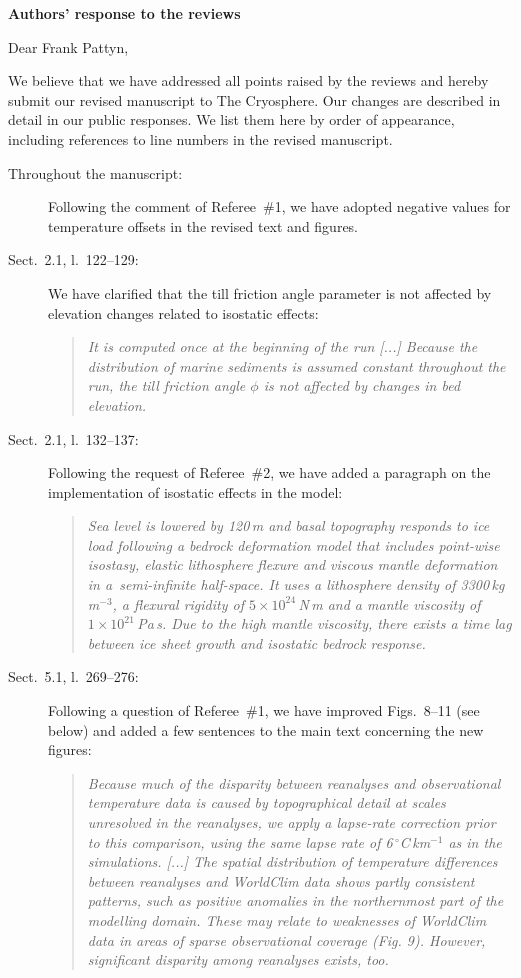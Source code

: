 \documentclass[10pt]{article}
\begin{document}
\textbf{Authors' response to the reviews}
\bigskip

\def\msquote#1{\begin{quote}\textit{#1}\end{quote}}

Dear Frank Pattyn,

We believe that we have addressed all points raised by the reviews and hereby submit our revised manuscript to The Cryosphere. Our changes are described in detail in our public responses. We list them here by order of appearance, including references to line numbers in the revised manuscript.

\begin{description}

\item[Throughout the manuscript:]
  Following the comment of Referee~{\#}1, we have adopted negative values for temperature offsets in the revised text and figures.

\item[Sect.~2.1, l.~122--129:]
  We have clarified that the till friction angle parameter is not affected by elevation changes related to isostatic effects:

  \msquote{It is computed once at the beginning of the run [...] Because the distribution of marine sediments is assumed constant throughout the run, the till friction angle $\phi$ is not affected by changes in bed elevation.}

\item[Sect.~2.1, l.~132--137:]
   Following the request of Referee~{\#}2, we have added a paragraph on the implementation of isostatic effects in the model:

  \msquote{Sea level is lowered by 120\,m and basal topography responds to ice load following a bedrock deformation model that includes point-wise isostasy, elastic lithosphere flexure and viscous mantle deformation in a~semi-infinite half-space. It uses a lithosphere density of 3300\,kg\,m$^{-3}$, a flexural rigidity of $5 \times 10^{24}$\,N\,m and a mantle viscosity of $1 \times 10^{21}$\,Pa\,s. Due to the high mantle viscosity, there exists a time lag between ice sheet growth and isostatic bedrock response.}

\item[Sect.~5.1, l.~269--276:]
  Following a question of Referee~{\#}1, we have improved Figs.~8--11 (see below) and added a few sentences to the main text concerning the new figures:

  \msquote{Because much of the disparity between reanalyses and observational temperature data is caused by topographical detail at scales unresolved in the reanalyses, we apply a lapse-rate correction prior to this comparison, using the same lapse rate of 6\,$^\circ$C\,km$^{-1}$ as in the simulations. [...] The spatial distribution of temperature differences between reanalyses and WorldClim data shows partly consistent patterns, such as positive anomalies in the northernmost part of the modelling domain. These may relate to weaknesses of WorldClim data in areas of sparse observational coverage (Fig. 9). However, significant disparity among reanalyses exists, too.}


\end{description}
\end{document}

